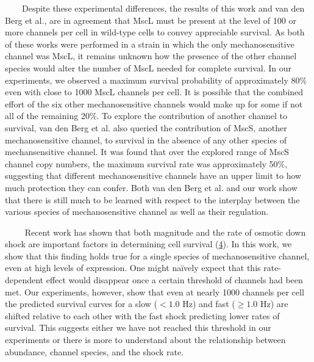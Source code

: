 ~~~~Despite
these
experimental
differences,
the
results
of
this
work
and
van
den
Berg
et
al.,
are in
agreement
that
MscL
must
be
present
at the
level
of 100
or
more
channels
per
cell
in
wild-type
cells
to
convey
appreciable
survival.
As
both
of
these
works
were
performed
in a
strain
in
which
the
only
mechanosensitive
channel
was
MscL,
it
remains
unknown
how
the
presence
of the
other
channel
species
would
alter
the
number
of
MscL
needed
for
complete
survival.
In our
experiments,
we
observed
a
maximum
survival
probability
of
approximately
80\%
even
with
close
to
1000
MscL
channels
per
cell.
It is
possible
that
the
combined
effort
of the
six
other
mechanosensitive
channels
would
make
up for
some
if not
all of
the
remaining
20\%.
To
explore
the
contribution
of
another
channel
to
survival,
van
den
Berg
et al.
also
queried
the
contribution
of
MscS,
another
mechanosensitive
channel,
to
survival
in the
absence
of any
other
species
of
mechansensitive
channel.
It was
found
that
over
the
explored
range
of
MscS
channel
copy
numbers,
the
maximum
survival
rate
was
approximately
50\%,
suggesting
that
different
mechanosensitive
channels
have
an
upper
limit
to how
much
protection
they
can
confer.
Both
van
den
Berg
et al.
and
our
work
show
that
there
is
still
much
to be
learned
with
respect
to the
interplay
between
the
various
species
of
mechanosensitive
channel
as
well
as
their
regulation.

~~~~
Recent
work
has
shown
that
both
magnitude
and
the
rate
of
osmotic
down
shock
are
important
factors
in
determining
cell
survival
(\protect\hyperlink{ref-bialecka-fornal2015}{4}).
In
this
work,
we
show
that
this
finding
holds
true
for a
single
species
of
mechanosensitive
channel,
even
at
high
levels
of
expression.
One
might
naïvely
expect
that
this
rate-dependent
effect
would
disappear
once a
certain
threshold
of
channels
had
been
met.
Our
experiments,
however,
show
that
even
at
nearly
1000
channels
per
cell
the
predicted
survival
curves
for a
slow
(\(< 1.0\)
Hz)
and
fast
(\(\geq 1.0\)
Hz)
are
shifted
relative
to
each
other
with
the
fast
shock
predicting
lower
rates
of
survival.
This
suggests
either
we
have
not
reached
this
threshold
in our
experiments
or
there
is
more
to
understand
about
the
relationship
between
abundance,
channel
species,
and
the
shock
rate.

